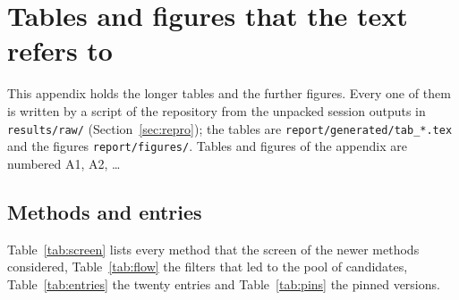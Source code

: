 \renewcommand{\thetable}{A\arabic{table}}
\renewcommand{\thefigure}{A\arabic{figure}}
\setcounter{table}{0}\setcounter{figure}{0}

\section{Tables and figures that the text refers to}\label{sec:appendix}
This appendix holds the longer tables and the further figures. Every one of them is written by a script of the repository from the unpacked session outputs in \texttt{results/raw/} (Section~\ref{sec:repro}); the tables are \texttt{report/generated/tab\_*.tex} and the figures \texttt{report/figures/}. Tables and figures of the appendix are numbered A1, A2, \ldots

\subsection{Methods and entries}
Table~\ref{tab:screen} lists every method that the screen of the newer methods considered, Table~\ref{tab:flow} the filters that led to the pool of candidates, Table~\ref{tab:entries} the twenty entries and Table~\ref{tab:pins} the pinned versions.

\begin{center}\small
{}\label{tab:screen}

\end{center}
\addtocounter{table}{-1}%

\begin{table}[tbp]
\centering\small
\caption{From the pool of cryo-EM entries released from 1~January to 12~October 2026 to the candidates. The map--model correlation rule and the clustering (Section~\ref{sec:datasets}) are applied to the \PoolFinal{} candidates of the last row.}
\label{tab:flow}
\fitwidth{}
\end{table}


